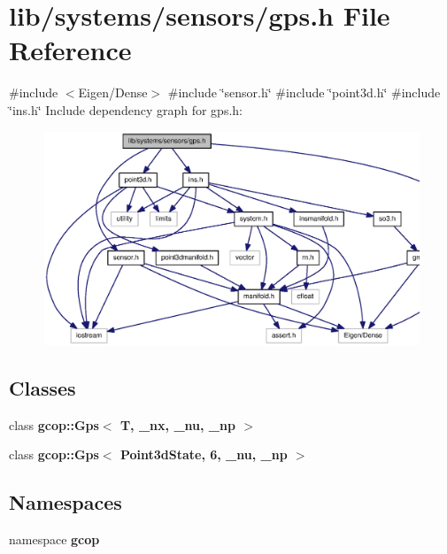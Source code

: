 \section{lib/systems/sensors/gps.h \-File \-Reference}
\label{gps_8h}
{\ttfamily \#include $<$\-Eigen/\-Dense$>$}\*
{\ttfamily \#include \char`\"{}sensor.\-h\char`\"{}}\*
{\ttfamily \#include \char`\"{}point3d.\-h\char`\"{}}\*
{\ttfamily \#include \char`\"{}ins.\-h\char`\"{}}\*
\-Include dependency graph for gps.\-h\-:
\nopagebreak
\begin{figure}[H]
\begin{center}
\leavevmode
\includegraphics[width=350pt]{gps_8h__incl}
\end{center}
\end{figure}
\subsection*{\-Classes}
\begin{DoxyCompactItemize}
\item 
class {\bf gcop\-::\-Gps$<$ T, \-\_\-nx, \-\_\-nu, \-\_\-np $>$}
\item 
class {\bf gcop\-::\-Gps$<$ Point3d\-State, 6, \-\_\-nu, \-\_\-np $>$}
\end{DoxyCompactItemize}
\subsection*{\-Namespaces}
\begin{DoxyCompactItemize}
\item 
namespace {\bf gcop}
\end{DoxyCompactItemize}
